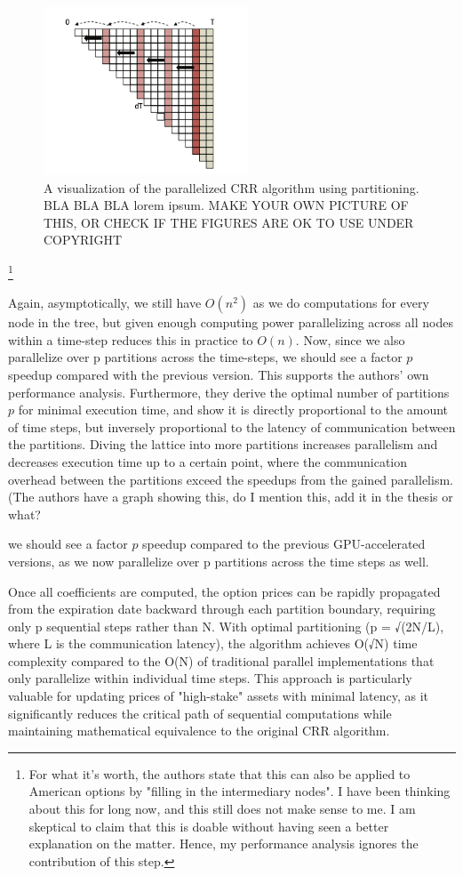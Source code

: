 \documentclass[english,12pt,a4paper,pdftex,sci,utf8]{aaltothesis}
\begin{document}
\begin{figure}[h]
    \centering
    \includegraphics[height=5cm]{CRRpartitioned.png}
    \caption{A visualization of the parallelized CRR algorithm using partitioning. BLA BLA BLA lorem ipsum. MAKE YOUR OWN PICTURE OF THIS, OR CHECK IF THE FIGURES ARE OK TO USE UNDER COPYRIGHT}
    \label{fig:combined}
\end{figure}


\footnote{For what it's worth, the authors state that this can also be applied to American options by "filling in the intermediary nodes". I have been thinking about this for long now, and this still does not make sense to me. I am skeptical to claim that this is doable without having seen a better explanation on the matter. Hence, my performance analysis ignores the contribution of this step.}

Again, asymptotically, we still have $O(n^2)$ as we do computations for every node in the tree, but given enough computing power parallelizing across all nodes within a time-step reduces this in practice to $O(n)$. Now, since we also parallelize over p partitions across the time-steps, we should see a factor $p$ speedup compared with the previous version. This supports the authors' own performance analysis. Furthermore, they derive the optimal number of partitions $p$ for minimal execution time, and show it is directly proportional to the amount of time steps, but inversely proportional to the latency of communication between the partitions. Diving the lattice into more partitions increases parallelism and decreases execution time up to a certain point, where the communication overhead between the partitions exceed the speedups from the gained parallelism. (The authors have a graph showing this, do I mention this, add it in the thesis or what?

we should see a factor $p$ speedup compared to the previous GPU-accelerated versions, as we now parallelize over p partitions across the time steps as well.


Once all coefficients are computed, the option prices can be rapidly propagated from the expiration date backward through each partition boundary, requiring only p sequential steps rather than N. With optimal partitioning (p = √(2N/L), where L is the communication latency), the algorithm achieves O(√N) time complexity compared to the O(N) of traditional parallel implementations that only parallelize within individual time steps.
This approach is particularly valuable for updating prices of "high-stake" assets with minimal latency, as it significantly reduces the critical path of sequential computations while maintaining mathematical equivalence to the original CRR algorithm.
\end{document}
